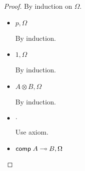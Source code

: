 \begin{proof}\label{sec:derivation_theorem}
   By induction on $\Omega$.
   
   \begin{itemize}
      \item $p, \Omega$
      
      By induction.
      
      \item $1, \Omega$
      
      By induction.
      
      \item $A \otimes B, \Omega$
      
      By induction.
      
      \item $\cdot$
      
      Use axiom.
      
      \item $\mathsf{comp} \; A \multimap B, \Omega$
      

\end{itemize}
\end{proof}
